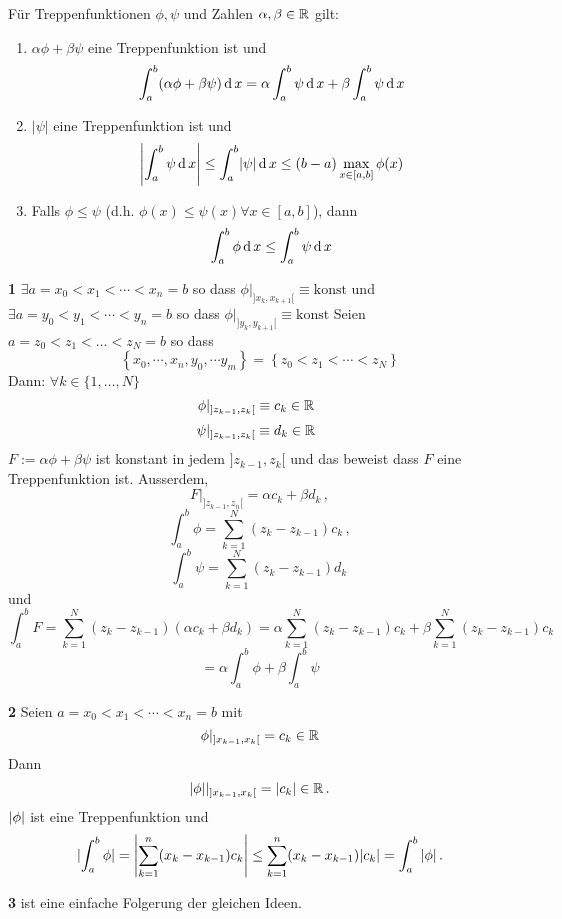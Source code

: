 \begin{Lem}
  Für Treppenfunktionen $\phi, \psi$ und Zahlen $\alpha, \beta\in\mathbb{R}$ gilt:
  \begin{enumerate}
    \item $\alpha \phi +\beta\psi$ eine Treppenfunktion ist und
      \[\int^b_a(\alpha\phi + \beta\psi)\operatorname{d} x=\alpha\int_a^b\psi\operatorname{d} x+\beta\int^b_a\psi\operatorname{d} x\]
    \item $|\psi|$ eine Treppenfunktion ist und
      \[\left|\int_a^b\psi\operatorname{d} x\right|\leq \int_a^b\mathopen| \psi \mathclose|\operatorname{d} x\leq (b-a)\max_{x\in [a,b]} \phi (x) \]
    \item Falls $\phi\leq\psi$ (d.h. $\phi(x)\leq \psi(x)\forall x\in [a,b]$), dann
      \[\int_a^b\phi\operatorname{d} x\leq\int_a^b\psi\operatorname{d} x\]
  \end{enumerate}
\end{Lem}
\begin{Bew} {\bf 1}
$\exists a = x_0<x_1<\cdots<x_n=b$ so dass $\phi|_{]x_k, x_{k+1}[}\equiv \mbox{konst}$ 
und $\exists a = y_0<y_1<\cdots<y_n=b$ so dass $\phi|_{]y_k, y_{k+1}[}\equiv \mbox{konst}$
Seien $a= z_0< z_1 < \ldots < z_N= b$ so dass
\[\left\{ x_0,\cdots,x_n,y_0,\cdots y_m \right\}=\left\{ z_0<z_1<\cdots<z_N \right\}\]
Dann: $\forall k\in \{1, \ldots, N\}$
\[\phi|_{]z_{k-1},z_k[}\equiv c_k\in\mathbb{R}\hspace{2mm}\]
\[\psi|_{]z_{k-1},z_k[}\equiv d_k\in\mathbb{R}\hspace{2mm}\]
$F := \alpha\phi+\beta\psi$ ist konstant in jedem $]z_{k-1}, z_k[$ und
das beweist dass $F$ eine Treppenfunktion ist. Ausserdem,
\[F|_{]z_{k-1},z_n[}=\alpha c_k + \beta d_k\, ,\]
\[\int_a^b\phi=\sum_{k=1}^N(z_k-z_{k-1})c_k\, ,\]
\[\int_a^b\psi=\sum_{k=1}^N(z_k-z_{k-1})d_k\, \]
und
\[\int_a^bF=\sum^N_{k=1}(z_k-z_{k-1})(\alpha c_k+\beta d_k)
=\alpha\sum_{k=1}^N(z_k-z_{k-1})c_k+\beta\sum_{k=1}^N(z_k-z_{k-1})c_k\]
\[=\alpha\int_a^b\phi+\beta\int_a^b\psi\]

\medskip

{\bf 2} Seien $a=x_0<x_1<\cdots<x_n=b$ mit
\[\phi|_{]x_{k-1},x_k[}=c_k\in\mathbb{R}\]
Dann
\[\mathopen| \phi \mathclose||_{]x_{k-1},x_k[}=\mathopen| c_k \mathclose|\in\mathbb{R}\, .\]
$\mathopen| \phi \mathclose|$ ist eine Treppenfunktion und
\[
\mathopen| \int_a^b\phi \mathclose|=\left|\sum^n_{k=1}(x_k-x_{k-1})c_k\right|
\leq \sum^n_{k=1}(x_k-x_{k-1})\mathopen| c_k \mathclose|= \int_a^b |\phi|\, .
\]

\medskip
{\bf 3} ist eine einfache Folgerung der gleichen Ideen.
\end{Bew}
